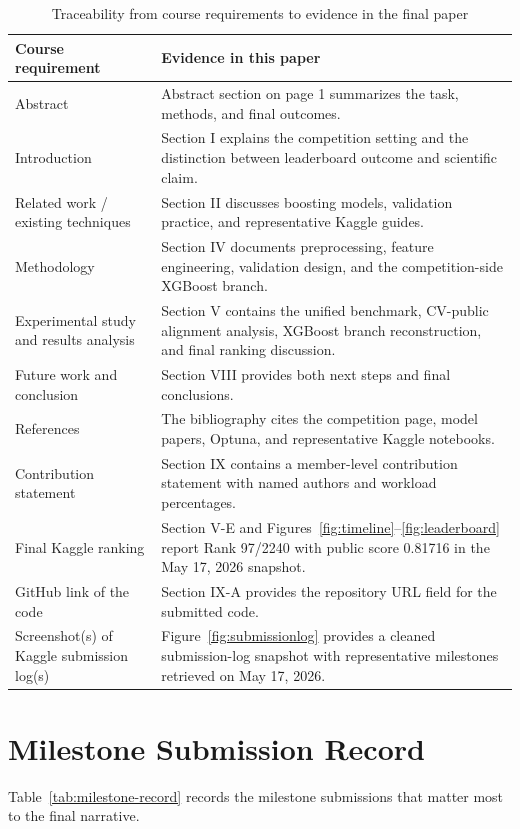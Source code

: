 \documentclass[conference]{IEEEtran}
\begin{document}
\begin{table}[!t]
\caption{Traceability from course requirements to evidence in the final paper}
\label{tab:requirement-map}
\centering
\scriptsize
\begin{tabularx}{\textwidth}{>{\raggedright\arraybackslash}p{}X}
\toprule
Course requirement & Evidence in this paper \\
\midrule
Abstract & Abstract section on page 1 summarizes the task, methods, and final outcomes. \\
Introduction & Section I explains the competition setting and the distinction between leaderboard outcome and scientific claim. \\
Related work / existing techniques & Section II discusses boosting models, validation practice, and representative Kaggle guides. \\
Methodology & Section IV documents preprocessing, feature engineering, validation design, and the competition-side XGBoost branch. \\
Experimental study and results analysis & Section V contains the unified benchmark, CV-public alignment analysis, XGBoost branch reconstruction, and final ranking discussion. \\
Future work and conclusion & Section VIII provides both next steps and final conclusions. \\
References & The bibliography cites the competition page, model papers, Optuna, and representative Kaggle notebooks. \\
Contribution statement & Section IX contains a member-level contribution statement with named authors and workload percentages. \\
Final Kaggle ranking & Section V-E and Figures~\ref{fig:timeline}--\ref{fig:leaderboard} report Rank 97/2240 with public score 0.81716 in the May 17, 2026 snapshot. \\
GitHub link of the code & Section IX-A provides the repository URL field for the submitted code. \\
Screenshot(s) of Kaggle submission log(s) & Figure~\ref{fig:submissionlog} provides a cleaned submission-log snapshot with representative milestones retrieved on May 17, 2026. \\
\bottomrule
\end{tabularx}
\end{table}

\section{Milestone Submission Record}
Table~\ref{tab:milestone-record} records the milestone submissions that matter most to the final narrative.
\end{document}
